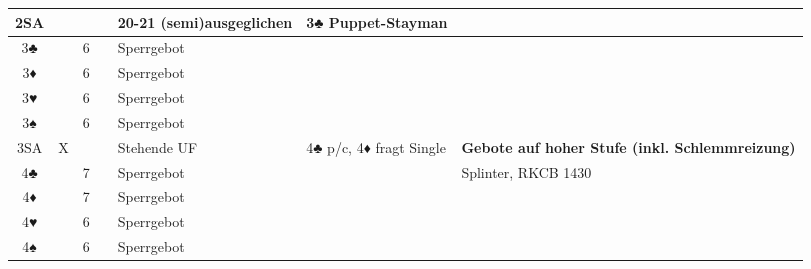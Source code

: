 \documentclass{article}
\begin{document}
\begin{tabularx}{\columnwidth}{|c|c|c|c|l|l|X|l|}
\hline 2SA & & & & 20-21 (semi)ausgeglichen & 3♣ Puppet-Stayman & & \\
\hline 3♣  & &6& & Sperrgebot & & & \\
\hline 3♦  & &6& & Sperrgebot & & & \\
\hline 3♥  & &6& & Sperrgebot & & & \\
\hline 3♠  & &6& & Sperrgebot & & & \\
\hline 3SA &X& & & Stehende UF & 4♣ p/c, 4♦ fragt Single & \multicolumn{2}{l|}{\bf Gebote auf hoher Stufe (inkl. Schlemmreizung)} \\
\hline 4♣  & &7& & Sperrgebot & & \multicolumn{2}{l|}{Splinter, RKCB 1430} \\
\hline 4♦  & &7& & Sperrgebot & & \multicolumn{2}{l|}{} \\
\hline 4♥  & &6& & Sperrgebot & & \multicolumn{2}{l|}{} \\
\hline 4♠  & &6& & Sperrgebot & & \multicolumn{2}{l|}{} \\
\hline \end{tabularx}
\end{document}

